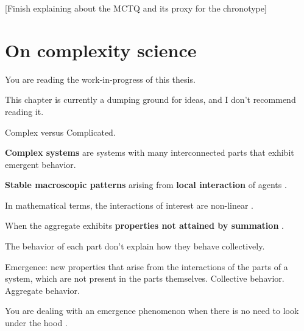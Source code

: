 \documentclass[
12pt,
openright,
oneside,
a4paper,
chapter=TITLE,
section=TITLE,
french,
spanish,
brazil,
english
]{abntex2}\usepackage{array}
\newcommand{\microskip}{\vspace{\microskipamount}}
\begin{document}
{[}Finish explaining about the MCTQ and its proxy for the chronotype{]}


\chapter{On complexity science}\label{on-complexity-science}

\begin{tcolorbox}[enhanced jigsaw, opacitybacktitle=0.6, titlerule=0mm, coltitle=black, bottomtitle=1mm, breakable, rightrule=.15mm, left=2mm, title=\textcolor{quarto-callout-important-color}{\faExclamation}\hspace{0.5em}{Important}, opacityback=0, colbacktitle=quarto-callout-important-color!10!white, toprule=.15mm, toptitle=1mm, leftrule=.75mm, colback=white, bottomrule=.15mm, arc=.35mm, colframe=quarto-callout-important-color-frame]

You are reading the work-in-progress of this thesis.

\microskip

This chapter is currently a dumping ground for ideas, and I don't
recommend reading it.

\end{tcolorbox}

Complex versus Complicated.

\textbf{Complex systems} are systems with many interconnected parts that
exhibit emergent behavior.

\textbf{Stable macroscopic patterns} arising from \textbf{local
interaction} of agents \autocite{epstein1999}.

In mathematical terms, the interactions of interest are non-linear
\autocite{holland2014}.

When the aggregate exhibits \textbf{properties not attained by
summation} \autocite{holland2014}.

The behavior of each part don't explain how they behave collectively.

Emergence: new properties that arise from the interactions of the parts
of a system, which are not present in the parts themselves. Collective
behavior. Aggregate behavior.

You are dealing with an emergence phenomenon when there is no need to
look under the hood \autocite{krakauer2023}.
\end{document}
